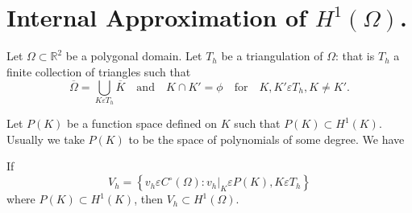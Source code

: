 \section{Internal Approximation of $H^1(\Omega)$.}\label{chap3:ssec3.2}
Let $\Omega\subset\mathbb{R}^2$ be a polygonal domain. Let $T_h$ 
be a triangulation of $\Omega$: that is $T_h$ a finite collection 
of triangles such that 
$$
\overline{\Omega}=\bigcup\limits_{K\varepsilon T_h}\overline{K}\quad
\text{and}\quad K\cap K'=\phi\quad\text{for}\quad K, K'\varepsilon
T_h, K\neq K'.
$$

Let $P(K)$ be a function space defined on $K$ such that $P(K)\subset
H^1(K)$. Usually we take $P(K)$ to be the space of polynomials of some
degree. We have 

\begin{THM}\label{chap3:THM2}
If 
$$
V_h=\left\{v_h\varepsilon C^\circ(\Omega):v_h|_K\varepsilon P(K), K
\varepsilon T_h\right\}
$$
where $P(K)\subset H^1(K)$, then $V_h\subset H^1(\Omega)$. 
\end{THM}

